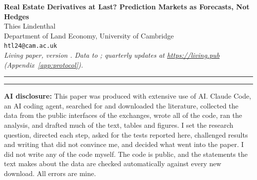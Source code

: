 \documentclass[12pt,a4paper]{article}
\newif\ifanon
\begin{document}
\begin{center}
  \vspace*{0.5em}
  {\large\bfseries\singlespacing Real Estate Derivatives at Last? Prediction Markets as Forecasts, Not Hedges}\\[1.5em]
  \ifanon
    {\small\textit{Submitted for blind review}}\\[0.3em]
  \else
    {\normalsize
      Thies Lindenthal\\[0.4em]
      Department of Land Economy, University of Cambridge\\[0.2em]
      \texttt{htl24@cam.ac.uk}}\\[1.2em]
    {\small\textit{Living paper, version \versionId{}. Data to \dataDate{}; quarterly updates at \url{https://living.pub} (Appendix~\ref{app:protocol}).}}\\[0.3em]
  \fi
\end{center}

\noindent\rule{\textwidth}{0.4pt}

\begin{abstract}
\noindent\small Exchanges have listed derivatives on property prices since 1991 and none has become liquid. Event contracts on prediction markets are the latest attempt. This paper asks whether they remove the obstacles that stopped earlier property derivatives, using all real estate contracts listed on Kalshi since \firstOpen{} and the house price contracts on Polymarket. They do not. Kalshi's \reMarkets{} real estate contracts account for \reVolShare{} per cent of the volume in its economics category, and a real estate event trades about \condGap{} per cent less than a comparable economics event. On Polymarket the median account traded \walletMedianUsd{} dollars and \walletOneMonth{} per cent of accounts never returned. The contracts are quoted as tightly and priced as accurately as other economics contracts, so they work as forecasts, but they do not transfer risk. In \pairs{} repeat sales from Cook County, Illinois, an index hedge removes at most \hedgeUnderTwo{} per cent of house-level price variance for holdings under two years, and no real estate contract on Kalshi runs longer than \reMaxHorizonMonths{} months. The open order books would cover \depthMedianShare{} per cent of a hedge for a single 500,000 dollar home.
\end{abstract}

\noindent\rule{\textwidth}{0.4pt}
\noindent\small \textbf{AI disclosure:} This paper was produced with extensive use of AI. Claude Code, an AI coding agent, searched for and downloaded the literature, collected the data from the public interfaces of the exchanges, wrote all of the code, ran the analysis, and drafted much of the text, tables and figures. I set the research question, directed each step, asked for the tests reported here, challenged results and writing that did not convince me, and decided what went into the paper. I did not write any of the code myself. The code is public, and the statements the text makes about the data are checked automatically against every new download. All errors are mine.
\end{document}
